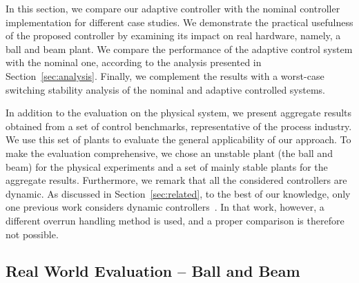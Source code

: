 %
In this section, we compare our adaptive controller with the nominal controller implementation for different case studies.
We demonstrate the practical usefulness of the proposed controller by examining its impact on real hardware, namely, a ball and beam plant.
We compare the performance of the adaptive control system with the nominal one, according to the analysis presented in Section~\ref{sec:analysis}.
Finally, we complement the results with a worst-case switching stability analysis of the nominal and adaptive controlled systems.

In addition to the evaluation on the physical system, we present aggregate results obtained from a set of control benchmarks, representative of the process industry. %
We use this set of plants to evaluate the general applicability of our approach.
To make the evaluation comprehensive, we chose an unstable plant (the ball and beam) for the physical experiments and a set of mainly stable plants for the aggregate results.
Furthermore, we remark that all the considered controllers are dynamic.
As discussed in Section~\ref{sec:related}, to the best of our knowledge, only one previous work considers dynamic controllers~\cite{Pazzaglia:2021}.
In that work, however, a different overrun handling method is used, and a proper comparison is therefore not possible.

\subsection{Real World Evaluation -- Ball and Beam}
\label{sec:realplant}
%
